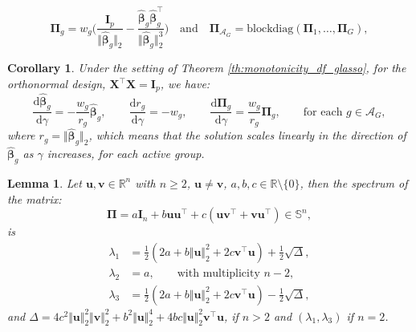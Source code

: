 \documentclass[10pt,a4paper]{amsart}
\newtheorem{corollary}{Corollary}
\newtheorem{lemma}{Lemma}
\newcommand{\Aset}{\mathcal{A}}
\newcommand{\T}{\top}
\def\bI{\mathbf{I}}
\def\bPi{\boldsymbol{\Pi}}
\def\bX{\mathbf{X}}
\newcommand{\betahat}{\widehat{\boldsymbol\beta}}
\def\bu{\boldsymbol{u}}
\def\bv{\boldsymbol{v}}
\newcommand{\trace}{\mathrm{trace}}
\begin{document}
\begin{equation}
\label{eq:Pi_Aset_definition}
\bPi_g = w_g \Bigg(\frac{\bI_{p}}{\Vert\betahat_g\Vert_2}-\frac{\betahat_g\betahat_g^{\T}}{\Vert\betahat_g\Vert_2^3}\Bigg) \quad \text{and} \quad \bPi_{\Aset_G} = \mathrm{blockdiag}(\bPi_1, \ldots, \bPi_G),
\end{equation}

\begin{corollary}
\label{coro:dbeta_dgamma_orto}
Under the setting of Theorem \ref{th:monotonicity_df_glasso}, for the orthonormal design, $\bX^{\T}\bX=\bI_p$, we have:
\begin{equation*}
\frac{\mathrm{d}\betahat_g}{\mathrm{d}\gamma} = - \frac{w_g}{r_g}  \betahat_g, \qquad  \frac{{\mathrm d}r_{g}}{{\mathrm d} \gamma} = -w_g, \qquad \frac{{\mathrm d}\bPi_{g}}{{\mathrm d} \gamma} = \frac{w_g}{r_g} \bPi_{g} , \qquad \text{for each } g \in \Aset_G,
\end{equation*}
where $r_g= \Vert\betahat_g\Vert_2$, which means that the solution scales linearly in the direction of $\betahat_g$ as $\gamma$ increases, for each active group.
\end{corollary}

\begin{lemma}
\label{lemma:Pi_eigenvalues_all}
Let $\boldsymbol{u},\boldsymbol{v} \in \mathbb{R}^n$ with $n\geq 2$, $\bu\neq\bv$, $a,b,c\in\mathbb{R}\setminus \{0\}$, then the spectrum of the matrix:
\begin{equation*}
\boldsymbol{\Pi} = a \boldsymbol{I}_n + b \boldsymbol{u} \boldsymbol{u}^{\T} + c(\boldsymbol{u}\boldsymbol{v}^{\T} + \boldsymbol{v}\boldsymbol{u}^{\T})\in\mathbb{S}^n,
\end{equation*}
is
%
\begin{align*}
\lambda_1 &= \frac{1}{2}(2 a+b \Vert\bu\Vert_2^2+2 c \bv^{\T}\bu) + \frac{1}{2}\sqrt{\Delta}, \\
\lambda_2 &= a, \qquad \text{with multiplicity } n - 2, \\
\lambda_3 &= \frac{1}{2}(2 a+b \Vert\bu\Vert_2^2+2 c \bv^{\T}\bu) - \frac{1}{2}\sqrt{\Delta},
\end{align*}
and $\Delta =4c^2\Vert\bu\Vert_2^2\Vert\bv\Vert_2^2+b^2\Vert\bu\Vert_2^4+4bc\Vert\bu\Vert_2^2\bv^{\T}\bu$, if $n>2$ and $(\lambda_1,\lambda_3)$ if $n=2$.
%
\end{lemma}
\end{document}
